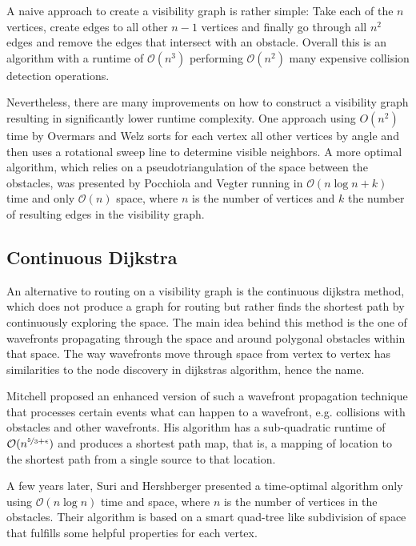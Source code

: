 \documentclass[
	a4paper,
	11pt,
	twoside,
	twocolumn
]{article}
\newcommand{\bigo}[1]{\mathcal{O}(#1)}
\begin{document}
			A naive approach to create a visibility graph is rather simple: Take each of the $n$ vertices, create edges to all other $n-1$ vertices and finally go through all $n^2$ edges and remove the edges that intersect with an obstacle.
			Overall this is an algorithm with a runtime of $\bigo{n^3}$ performing $\bigo{n^2}$ many expensive collision detection operations.
			
			Nevertheless, there are many improvements on how to construct a visibility graph resulting in significantly lower runtime complexity.
			One approach using $O(n^2)$ time by Overmars and Welz sorts for each vertex all other vertices by angle and then uses a rotational sweep line to determine visible neighbors. \cite{overmars1988new}
			A more optimal algorithm, which relies on a pseudotriangulation of the space between the obstacles, was presented by Pocchiola and Vegter running in $\bigo{n \log{n} + k}$ time and only $\bigo{n}$ space, where $n$ is the number of vertices and $k$ the number of resulting edges in the visibility graph.\cite{pocchiola1996topologically}
		
		\subsection{Continuous Dijkstra}
		
			An alternative to routing on a visibility graph is the continuous dijkstra method, which does not produce a graph for routing but rather finds the shortest path by continuously exploring the space.
			The main idea behind this method is the one of wavefronts propagating through the space and around polygonal obstacles within that space.
			The way wavefronts move through space from vertex to vertex has similarities to the node discovery in dijkstras algorithm, hence the name.\cite[9]{mitchell1987discrete}
			
			Mitchell proposed an enhanced version of such a wavefront propagation technique that processes certain events what can happen to a wavefront, e.g. collisions with obstacles and other wavefronts. \cite{mitchell1993shortest}
			His algorithm has a sub-quadratic runtime of $\bigo{n^{\nicefrac{5}{3} + \epsilon}}$ and produces a shortest path map, that is, a mapping of location to the shortest path from a single source to that location.
			
			A few years later, Suri and Hershberger presented a time-optimal algorithm only using $\bigo{n \log n}$ time and space, where $n$ is the number of vertices in the obstacles.\cite{hershberger1999optimal}
			Their algorithm is based on a smart quad-tree like subdivision of space that fulfills some helpful properties for each vertex.
		
\end{document}
